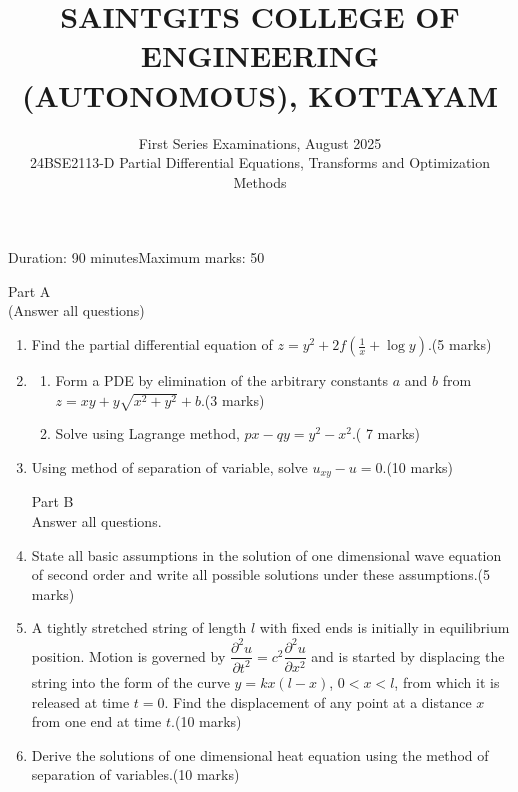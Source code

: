 \documentclass[]{article}
\title{\Large SAINTGITS COLLEGE OF ENGINEERING (AUTONOMOUS), KOTTAYAM}
\author{First Series Examinations, August 2025\\ 24BSE2113-D Partial Differential Equations, Transforms and Optimization Methods}
\date{}
\begin{document}
\maketitle
Duration: 90 minutes\hfill Maximum marks: 50
\begin{center}
	Part A\\
	(Answer all questions)
\end{center}
\begin{enumerate}
	\item Find the partial differential equation of $z=y^2+2f\left(\frac{1}{x}+\log y\right)$.\hfill (5 marks)
	\item 
	\begin{enumerate}
		\item  Form a PDE by elimination of the arbitrary constants $a$ and $b$ from $z=xy+y\sqrt{x^2+y^2}+b$.\hfill(3 marks)
		\item Solve using Lagrange method, $px-qy=y^2-x^2$.\hfill( 7 marks)
	\end{enumerate}
	\item Using method of separation of variable, solve $\displaystyle u_{xy}-u=0$.\hfill(10 marks)
	\begin{center}
		Part B\\
		Answer all questions.
	\end{center}
\item State all basic assumptions in the solution of one dimensional wave equation of second order and write all possible solutions under these assumptions.\hfill(5 marks)
\item A tightly stretched string of length $l$ with fixed ends is initially in equilibrium position. Motion is governed by $\displaystyle \dfrac{\partial^2 u}{\partial t^2}=c^2\dfrac{\partial^2 u}{\partial x^2}$ and is started by displacing the string into the form of the curve $y=kx\left(l-x\right)$, $0<x<l$, from which it is released at time $t=0$. Find the displacement of any point at a distance $x$ from one end at time $t$.\hfill(10 marks)
\item Derive the solutions of one dimensional heat equation using the method of separation of variables.\hfill(10 marks)
\end{enumerate}
\end{document}
